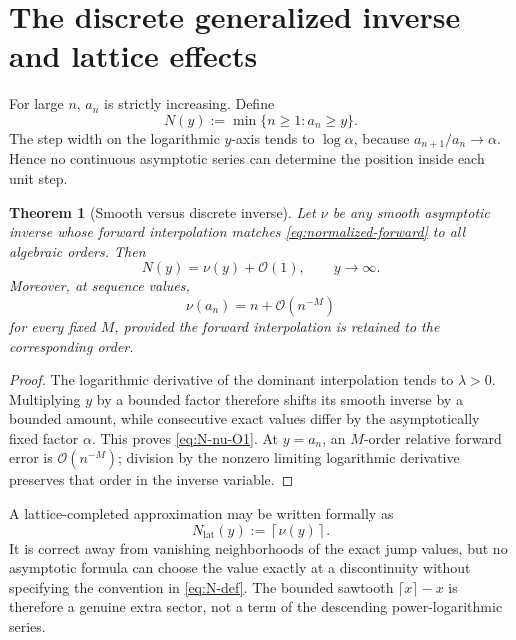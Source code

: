 \documentclass[11pt,oneside]{article}
\numberwithin{equation}{section}
\theoremstyle{plain}
\newtheorem{theorem}{Theorem}[section]
\theoremstyle{definition}
\theoremstyle{remark}
\newcommand{\Ord}{\mathcal O}
\begin{document}
\section{The discrete generalized inverse and lattice effects}\label{sec:discrete}

For large $n$, $a_n$ is strictly increasing.  Define
\begin{equation}\label{eq:N-def}
 N(y):=\min\{n\ge1:a_n\ge y\}.
\end{equation}
The step width on the logarithmic $y$-axis tends to
$\log\alpha$, because $a_{n+1}/a_n\to\alpha$.  Hence no continuous
asymptotic series can determine the position inside each unit step.

\begin{theorem}[Smooth versus discrete inverse]\label{thm:discrete-inverse}
Let $\nu$ be any smooth asymptotic inverse whose forward interpolation
matches \eqref{eq:normalized-forward} to all algebraic orders.  Then
\begin{equation}\label{eq:N-nu-O1}
 N(y)=\nu(y)+\Ord(1),\qquad y\to\infty.
\end{equation}
Moreover, at sequence values,
\begin{equation}\label{eq:nu-an-superalg}
 \nu(a_n)=n+\Ord(n^{-M})
\end{equation}
for every fixed $M$, provided the forward interpolation is retained to the
corresponding order.
\end{theorem}

\begin{proof}
The logarithmic derivative of the dominant interpolation tends to
$\lambda>0$.  Multiplying $y$ by a bounded factor therefore shifts its
smooth inverse by a bounded amount, while consecutive exact values differ
by the asymptotically fixed factor $\alpha$.  This proves
\eqref{eq:N-nu-O1}.  At $y=a_n$, an $M$-order relative forward error is
$\Ord(n^{-M})$; division by the nonzero limiting logarithmic derivative
preserves that order in the inverse variable.
\end{proof}

A lattice-completed approximation may be written formally as
\begin{equation}\label{eq:lattice-completion}
 N_{\mathrm{lat}}(y):=\left\lceil\nu(y)\right\rceil.
\end{equation}
It is correct away from vanishing neighborhoods of the exact jump values,
but no asymptotic formula can choose the value exactly at a discontinuity
without specifying the convention in \eqref{eq:N-def}.  The bounded
sawtooth $\lceil x\rceil-x$ is therefore a genuine extra sector, not a term
of the descending power-logarithmic series.
\end{document}

